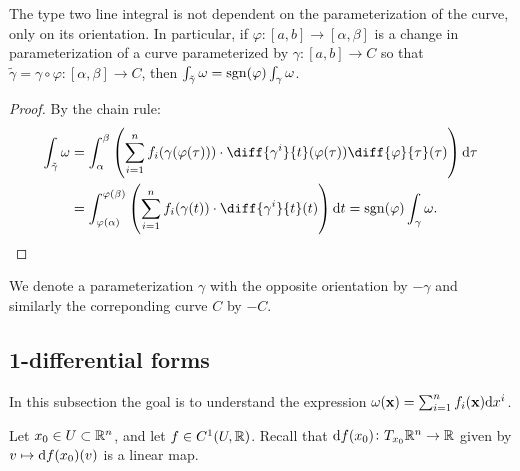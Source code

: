 \documentclass[11pt,a4paper]{article}
\begin{document}
\begin{proposition}
  \label{prop:orientations-affect-forms}
  The type two line integral is not dependent on the parameterization
  of the curve, only on its orientation.
  In particular, if $\varphi \colon [a,b] \to [\alpha,\beta]$
  is a change in parameterization
  of a curve parameterized by $\gamma \colon [a,b] \to C$ so that
  $\tilde \gamma = \gamma \circ \varphi \colon [\alpha,\beta] \to C$,
  then $\int_{\tilde \gamma} \omega = \operatorname{sgn}(\varphi) \int_{\gamma} \omega$.
\end{proposition}
\begin{proof}
  By the chain rule:
  \begin{align*}
    \int_{\tilde \gamma} \omega &=
    \int_{\alpha}^{\beta}
    \del{\sum_{i=1}^{n} f_i(\gamma(\varphi(\tau))) \cdot
    \diff{\gamma^i}{t}(\varphi(\tau)) \diff{\varphi}{\tau}(\tau)} \dtau \\ &=
    \int_{\varphi(\alpha)}^{\varphi(\beta)}
      \del{\sum_{i=1}^{n} f_i(\gamma(t)) \cdot \diff{\gamma^i}{t}(t)} \dt =
    \sgn(\varphi) \int_{\gamma} \omega.
  \end{align*}
\end{proof}

\begin{remark}
  We denote a parameterization $\gamma$ with the
  opposite orientation by $-\gamma$ and similarly
  the correponding curve $C$ by $-C$.
\end{remark}

\subsection{1-differential forms}

In this subsection the goal is to understand the expression
$\omega(\vec x) = \sum_{i=1}^{n} f_i(\vec x) \dx^i$.

Let $x_0 \in U \subset \mathbb{R}^n$,
and let $f \in C^1(U,\mathbb{R})$.
Recall that $\mathrm{d} f(x_0) \colon T_{x_0} \mathbb{R}^n \to \mathbb{R}$ given by
$v \mapsto \mathrm{d} f(x_0)(v)$ is a linear map.
\end{document}
